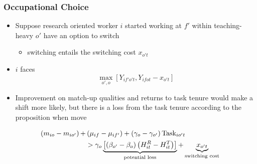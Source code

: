\documentclass[11pt]{beamer}
\begin{document}
\begin{frame}
	\frametitle{Occupational Choice}
	\begin{itemize}
		\item Suppose research oriented worker $i$ started working at $f'$ within teaching-heavy $o'$ have an option to switch
		\begin{itemize}
			\item switching entails the switching cost $x_{o't}$ 
		\end{itemize}
		\item $i$ faces 
		\begin{equation}
			\max_{o',o} \left[Y_{if'o't}, Y_{ifot}-x_{o't} \right] 
		\end{equation}
		\item Improvement on match-up qualities and returns to task tenure would make a shift more likely, but there is a loss from the task tenure according to the proposition when move
	\end{itemize}
\begin{align}	\label{eq:eq10}
	\left(m_{io}-m_{io'} \right) + &\left( \mu_{if}-\mu_{if'}\right)+\left( \gamma_o-\gamma_{o'}\right) \text{Task}_{io't} \\
	&>\gamma_o\underbrace{\left[ \left( \beta_{o'} - \beta_{o}\right) \left( H_{it}^R-H_{it}^T\right) \right]}_{\text{potential loss}} +  \underbrace{x_{o't}}_{\text{switching cost}} \notag
\end{align}
	
	
\end{frame}
\end{document}
